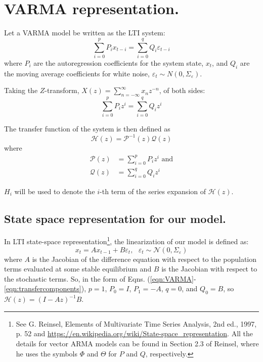 \documentclass{article}
\begin{document}
\newcommand{\trans}{^{\mathsmaller T}}
\newcommand{\xx}{{xx}}

\section{VARMA representation.}

Let a VARMA model be written as the LTI system:
\begin{equation}
\label{eqn:VARMA}
\sum_{i=0}^p P_i x_{t-i} = \sum_{i=0}^q Q_i \varepsilon_{t-i}
\end{equation}
where $P_i$ are the autoregression coefficients for the system state, $x_t$, and $Q_i$ are the moving average coefficients for white noise, $\varepsilon_t \sim N(0, \Sigma_\varepsilon)$. 

Taking the $Z$-transform, $X(z) = \sum_{n=-\infty}^{\infty}{x_n z^{-n}}$, of both sides:
\begin{equation}
\sum_{i=0}^p P_i z^i = \sum_{i=0}^q Q_i z^i
\end{equation}

The transfer function of the system is then defined as
\begin{equation}
    \mathcal{H}(z) = \mathcal{P}^{-1}(z) \mathcal{Q}(z)
    \label{eqn:transferfunction}
\end{equation}
where
\begin{align}
    \label{eqn:transfercomponents}
    \mathcal{P}(z) &= \sum_{i=0}^p P_i z^i \nonumber \text{ and} \\
    \mathcal{Q}(z) &= \sum_{i=0}^q Q_i z^i
\end{align}

$H_i$ will be used to denote the $i$-th term of the series expansion of $\mathcal{H}(z)$.

\subsection{State space representation for our model.}
In LTI state-space representation\footnote{See G. Reinsel, Elements of Multivariate Time Series Analysis, 2nd ed., 1997, p. 52 and \url{https://en.wikipedia.org/wiki/State-space_representation}. All the details for vector ARMA models can be found in Section 2.3 of Reinsel, where he uses the symbols $\Phi$ and $\Theta$ for $P$ and $Q$, respectively.}, the linearization of our model is defined as:
\begin{equation}
x_t = A x_{t-1} + B \varepsilon_{t}, ~~~\varepsilon_t \sim \mathcal{N}(0, \Sigma_\varepsilon)
\end{equation}
where $A$ is the Jacobian of the difference equation with respect to the population terms evaluated at some stable equilibrium and $B$ is the Jacobian with respect to the stochastic terms. So, in the form of Eqns. (\ref{eqn:VARMA}-\ref{eqn:transfercomponents}), $p=1$, $P_0=I$, $P_1=-A$, $q=0$, and $Q_0=B$, so $\mathcal{H}(z) = (I-Az)^{-1}B$.
\end{document}
